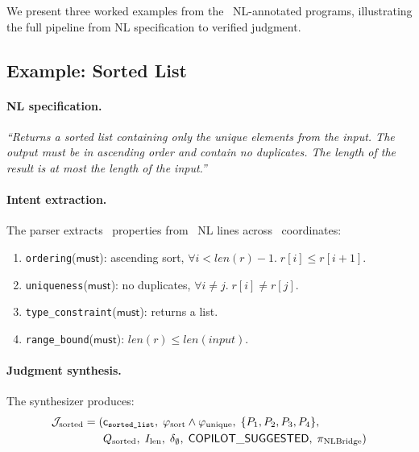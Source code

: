 \documentclass[11pt]{article}
\newcommand{\CopilotSugg}{\mathsf{COPILOT\_SUGGESTED}}
\begin{document}
We present three worked examples from the \ppLXXprogramCount\
NL-annotated programs, illustrating the full pipeline from NL
specification to verified judgment.

\subsection{Example: Sorted List}\label{sec:ex-sorted}

\paragraph{NL specification.}
\emph{``Returns a sorted list containing only the unique elements from
the input.  The output must be in ascending order and contain no
duplicates.  The length of the result is at most the length of the
input.''}

\paragraph{Intent extraction.}
The parser extracts \ppLXXnlsortedlistProps\ properties from
\ppLXXnlsortedlistNlLines\ NL lines across
\ppLXXnlsortedlistCoords\ coordinates:
\begin{enumerate}[noitemsep]
  \item \texttt{ordering}($\textsf{must}$): ascending sort,
        $\forall i < \mathit{len}(r)-1.\; r[i] \leq r[i+1]$.
  \item \texttt{uniqueness}($\textsf{must}$): no duplicates,
        $\forall i \neq j.\; r[i] \neq r[j]$.
  \item \texttt{type\_constraint}($\textsf{must}$): returns a list.
  \item \texttt{range\_bound}($\textsf{must}$):
        $\mathit{len}(r) \leq \mathit{len}(\mathit{input})$.
\end{enumerate}

\paragraph{Judgment synthesis.}
The synthesizer produces:
\begin{align*}
\J_{\text{sorted}} = (&\coord_{\texttt{sorted\_list}},\;
  \varphi_{\text{sort}} \wedge \varphi_{\text{unique}},\;
  \{P_1, P_2, P_3, P_4\}, \\
  &Q_{\text{sorted}},\; I_{\text{len}},\;
  \delta_\emptyset,\; \CopilotSugg,\;
  \pi_{\text{NLBridge}})
\end{align*}
\end{document}
